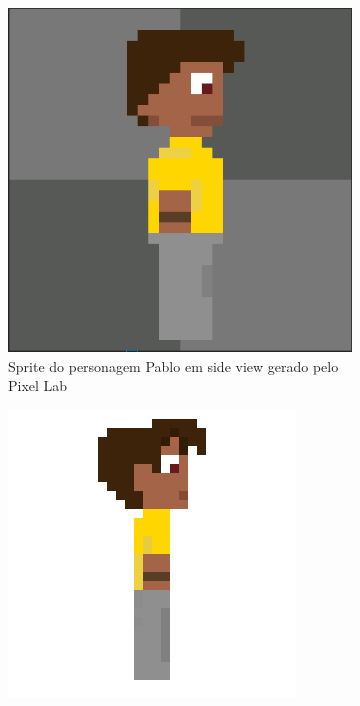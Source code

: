 \begin{figure}[htbp]
\begin{subfigure}{0.23\linewidth}
        \includegraphics[width=1\linewidth]{figs/pixelLab/dia2/fix_init_1.PNG}
        \caption{\small Sprite do personagem Pablo em side view gerado pelo Pixel Lab}
        \label{fig:geminiProPabloPixelLab}
    \end{subfigure}
    \begin{subfigure}{0.23\linewidth}
        \includegraphics[width=1\linewidth]{figs/sprites/Pablo_sideView.png}

\end{subfigure}
\end{figure}
